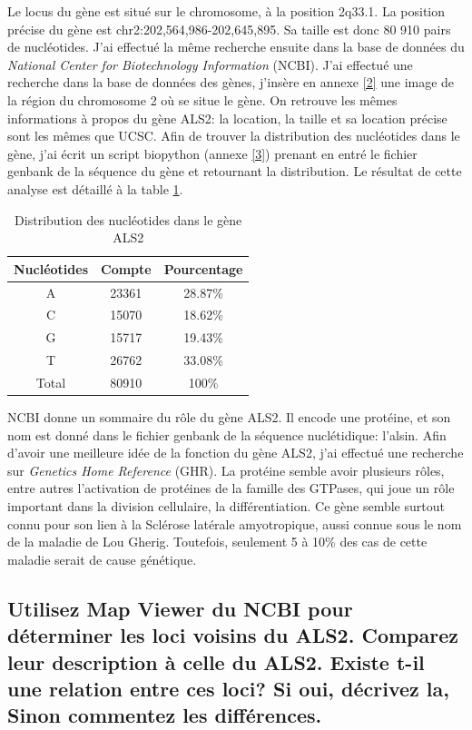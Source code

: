 \documentclass[10.8pt]{article} %
\begin{document}
Le locus du gène est situé sur le chromosome, à la position 2q33.1. La position précise du gène est chr2:202,564,986-202,645,895.
Sa taille est donc 80 910 pairs de nucléotides. J'ai effectué la même recherche ensuite dans la base de données du
\emph{National Center for Biotechnology Information} (NCBI). J'ai effectué une recherche dans la base de données des gènes,
j'insère en annexe \ref{2}  une image de la région du chromosome 2 où se situe le gène. On retrouve les mêmes informations
à propos du gène ALS2: la location, la taille et sa location précise sont les mêmes que UCSC. Afin de trouver la distribution
des nucléotides dans le gène, j'ai écrit un script biopython (annexe \ref{3}) prenant en entré le fichier genbank de la séquence
du gène et retournant la distribution. Le résultat de cette analyse est détaillé à la table \ref{tab:first}.
\begin{table}[b]
{\small
\centering
\begin{tabular}{|c|c|c|}

 \hline
 Nucléotides & Compte & Pourcentage \\
 \hline
 A & 23361 & 28.87\% \\
 \hline
  C & 15070 & 18.62\% \\
 \hline
  G & 15717 & 19.43\% \\
 \hline
  T & 26762 & 33.08\% \\
 \hline
  Total & 80910 & 100\% \\
 \hline
 \end{tabular}
\caption{{\small Distribution des nucléotides dans le gène ALS2}}
\label{tab:first}
}
\end{table}

NCBI donne un sommaire du rôle du gène ALS2. Il encode une protéine, et son nom est donné dans le fichier genbank de la séquence
nuclétidique: l'alsin. Afin d'avoir une meilleure idée de la fonction du gène ALS2, j'ai effectué une recherche sur 
\emph{Genetics Home Reference} (GHR). La protéine semble avoir plusieurs rôles, entre autres l'activation de 
protéines de la famille des GTPases, qui joue un rôle important dans la division cellulaire, la différentiation. Ce gène semble surtout
connu pour son lien à la Sclérose latérale amyotropique, aussi connue sous le nom de la maladie de Lou Gherig. 
Toutefois, seulement 5 à 10\% des cas de cette maladie serait de cause génétique. %

\subsection[Loci voisins du gène ALS2]{Utilisez Map Viewer du NCBI pour déterminer les loci voisins du ALS2. Comparez leur 
description à celle du ALS2. Existe t-il une relation entre ces loci? Si oui, décrivez la, Sinon commentez les différences.}
\end{document}
